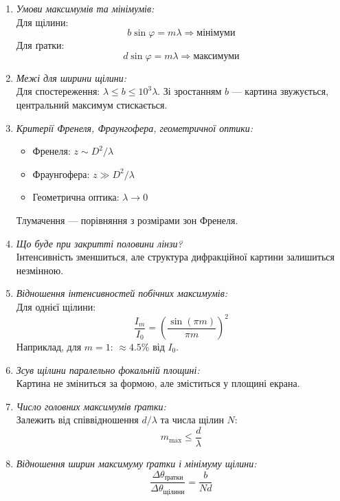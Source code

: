 \documentclass[12pt,a4paper]{article}
\begin{document}
\begin{enumerate}
  \item \textit{Умови максимумів та мінімумів:} \\
  Для щілини:
  \[
    b \sin\varphi = m\lambda \Rightarrow \text{мінімуми}
  \]
  Для ґратки:
  \[
    d \sin\varphi = m\lambda \Rightarrow \text{максимуми}
  \]

  \item \textit{Межі для ширини щілини:} \\
  Для спостереження: \( \lambda \leq b \leq 10^3\lambda \). Зі зростанням $b$ — картина звужується, центральний максимум стискається.

  \item \textit{Критерії Френеля, Фраунгофера, геометричної оптики:} \\
  \begin{itemize}
    \item Френеля: $z \sim D^2/\lambda$
    \item Фраунгофера: $z \gg D^2/\lambda$
    \item Геометрична оптика: $\lambda \rightarrow 0$
  \end{itemize}
  Тлумачення — порівняння з розмірами зон Френеля.

  \item \textit{Що буде при закритті половини лінзи?} \\
  Інтенсивність зменшиться, але структура дифракційної картини залишиться незмінною.

  \item \textit{Відношення інтенсивностей побічних максимумів:} \\
  Для однієї щілини:
  \[
    \frac{I_m}{I_0} = \left( \frac{\sin(\pi m)}{\pi m} \right)^2
  \]
  Наприклад, для $m = 1$: $\approx 4.5\%$ від $I_0$.

  \item \textit{Зсув щілини паралельно фокальній площині:} \\
  Картина не зміниться за формою, але зміститься у площині екрана.

  \item \textit{Число головних максимумів ґратки:} \\
  Залежить від співвідношення $d/\lambda$ та числа щілин $N$:
  \[
    m_{\text{max}} \leq \frac{d}{\lambda}
  \]

  \item \textit{Відношення ширин максимуму ґратки і мінімуму щілини:} \\
  \[
    \frac{\Delta\theta_{\text{ґратки}}}{\Delta\theta_{\text{щілини}}} = \frac{b}{Nd}
  \]


\end{enumerate}
\end{document}
